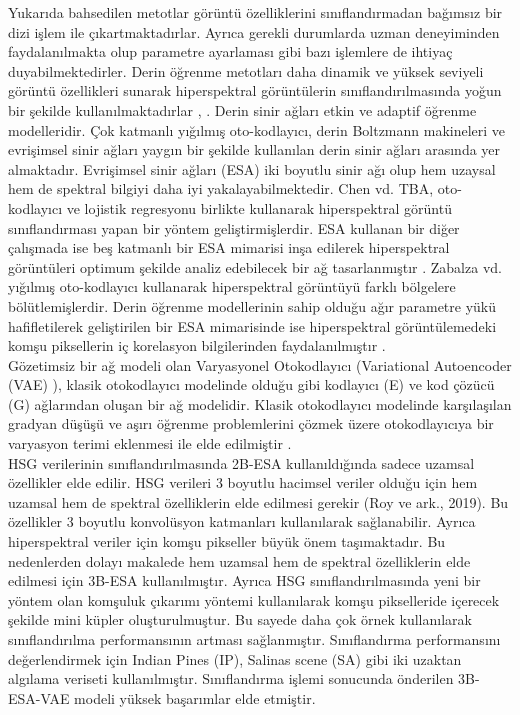 Yukarıda bahsedilen metotlar görüntü özelliklerini
sınıflandırmadan bağımsız bir dizi işlem ile
çıkartmaktadırlar. Ayrıca gerekli durumlarda uzman
deneyiminden faydalanılmakta olup parametre ayarlaması
gibi bazı işlemlere de ihtiyaç duyabilmektedirler. Derin
öğrenme metotları daha dinamik ve yüksek seviyeli görüntü
özellikleri sunarak hiperspektral görüntülerin
sınıflandırılmasında yoğun bir şekilde kullanılmaktadırlar
\cite{li2017hyperspectral}, \cite{yu2017convolutional}. Derin sinir ağları etkin ve adaptif öğrenme
modelleridir. Çok katmanlı yığılmış oto-kodlayıcı, derin
Boltzmann makineleri ve evrişimsel sinir ağları yaygın bir
şekilde kullanılan derin sinir ağları arasında yer almaktadır.
Evrişimsel sinir ağları (ESA) iki boyutlu sinir ağı olup hem
uzaysal hem de spektral bilgiyi daha iyi
yakalayabilmektedir. Chen vd. \cite{chen2014deep} TBA, oto-kodlayıcı ve
lojistik regresyonu birlikte kullanarak hiperspektral görüntü
sınıflandırması yapan bir yöntem geliştirmişlerdir. ESA
kullanan bir diğer çalışmada ise beş katmanlı bir ESA
mimarisi inşa edilerek hiperspektral görüntüleri optimum
şekilde analiz edebilecek bir ağ tasarlanmıştır \cite{hu2015deep}. Zabalza
vd. \cite{zabalza2016novel} yığılmış oto-kodlayıcı kullanarak hiperspektral
görüntüyü farklı bölgelere bölütlemişlerdir. Derin öğrenme
modellerinin sahip olduğu ağır parametre yükü\\ hafifletilerek
geliştirilen bir ESA mimarisinde ise hiperspektral
görüntülemedeki komşu piksellerin iç korelasyon
bilgilerinden faydalanılmıştır \cite{li2016hyperspectral}. \\

Gözetimsiz bir ağ modeli olan Varyasyonel Otokodlayıcı (Variational Autoencoder (VAE) ), klasik otokodlayıcı
modelinde olduğu gibi kodlayıcı (E) ve kod çözücü (G)
ağlarından oluşan bir ağ modelidir. Klasik otokodlayıcı
modelinde karşılaşılan gradyan düşüşü ve aşırı öğrenme
problemlerini çözmek üzere otokodlayıcıya bir varyasyon
terimi eklenmesi ile elde edilmiştir \cite{kingma2013auto}.\\
\newpage
HSG verilerinin sınıflandırılmasında 2B-ESA kullanıldığında sadece uzamsal özellikler elde edilir. HSG verileri 3 boyutlu
hacimsel veriler olduğu için hem uzamsal hem de spektral özelliklerin elde edilmesi gerekir (Roy ve ark., 2019). Bu özellikler 3
boyutlu konvolüsyon katmanları kullanılarak sağlanabilir. Ayrıca hiperspektral veriler için komşu pikseller büyük önem taşımaktadır.
Bu nedenlerden dolayı makalede hem uzamsal hem de spektral özelliklerin elde edilmesi için 3B-ESA kullanılmıştır. Ayrıca HSG
sınıflandırılmasında yeni bir yöntem olan komşuluk çıkarımı yöntemi kullanılarak komşu pikselleride içerecek şekilde mini küpler
oluşturulmuştur. Bu sayede daha çok örnek kullanılarak sınıflandırılma performansının artması sağlanmıştır. Sınıflandırma
performansını değerlendirmek için Indian Pines (IP), Salinas scene (SA) gibi iki uzaktan algılama veriseti
kullanılmıştır. Sınıflandırma işlemi sonucunda önderilen 3B-ESA-VAE modeli yüksek başarımlar elde etmiştir.

